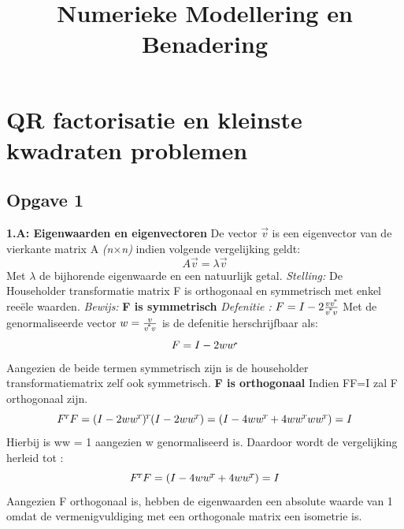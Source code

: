 \documentclass{Numerieke}
\newcommand\inv[1]{#1\raisebox{0.8ex}{$\scriptscriptstyle\!*$}}
\newcommand\transpose[1]{#1\raisebox{0.8ex}{$\scriptscriptstyle\!T$}}
\begin{document}

\title{Numerieke Modellering en Benadering}
\maketitle

\section{QR factorisatie en kleinste kwadraten problemen}
\subsection{Opgave 1}

\newline
\textbf{1.A: Eigenwaarden en eigenvectoren} \newline
De vector $\vec{v}$ is een eigenvector van de vierkante matrix A \textit{(n$\times$n)} indien volgende vergelijking geldt:
 \[A\vec{v} = \lambda\vec{v}\] 
 Met $\lambda$  de bijhorende eigenwaarde en een natuurlijk getal.\newline 
 \newline
 \textit{Stelling:} \newline
 De Householder transformatie matrix F is orthogonaal en symmetrisch met enkel reeële waarden. \newline
 \textit{Bewijs: } \newline
 \textbf{F is symmetrisch} \newline
 \textit{Defenitie :} \(F=I-2\frac{v\inv{v}}{\inv{v}v}  \)
 \newline
 Met de genormaliseerde vector \(w = \frac{v}{\inv{v}v}\) is de defenitie herschrijfbaar als: 
 \[F=I-2w\inv{w}\]
 Aangezien de beide termen symmetrisch zijn is de householder transformatiematrix zelf ook symmetrisch.\newline
 \textbf{F is orthogonaal} \newline
 Indien \transpose{F}F=I zal F orthogonaal zijn.
 \[\transpose{F}F = \transpose{(I-2w\transpose{w})}(I-2w\transpose{w}) = (I-4w\transpose{w}+4w\transpose{w}w\transpose{w}) = I\]
 Hierbij is \transpose{w}w = 1 aangezien w genormaliseerd is. Daardoor wordt de vergelijking herleid tot : \newline
  \[\transpose{F}F = (I-4w\transpose{w}+4w\transpose{w}) = I\]
  \newline
 Aangezien F orthogonaal is, hebben de eigenwaarden een absolute waarde van 1 omdat de vermenigvuldiging met een orthogonale matrix een isometrie is.\newline
\end{document}

